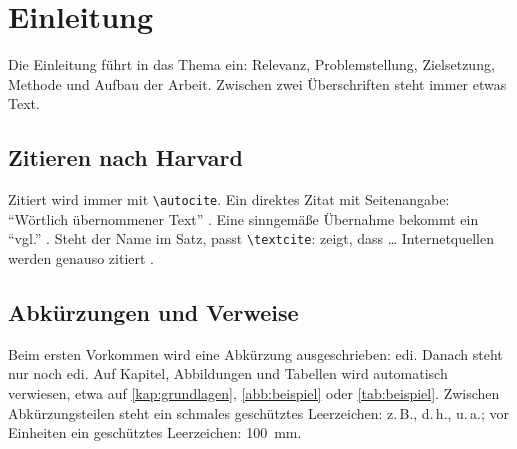 \chapter{Einleitung}
\label{kap:einleitung}

Die Einleitung führt in das Thema ein: Relevanz, Problemstellung, Zielsetzung,
Methode und Aufbau der Arbeit. Zwischen zwei Überschriften steht immer etwas Text.

\section{Zitieren nach Harvard}

Zitiert wird immer mit \verb|\autocite|. Ein direktes Zitat mit Seitenangabe:
\enquote{Wörtlich übernommener Text} \autocite[12]{mustermann2023}. Eine
sinngemäße Übernahme bekommt ein \enquote{vgl.} \autocite[vgl.][45--47]{schmidt2021}.
Steht der Name im Satz, passt \verb|\textcite|: \textcite{weber2024} zeigt, dass
\dots{} Internetquellen werden genauso zitiert \autocite{beispielblog2025}.

\section{Abkürzungen und Verweise}

Beim ersten Vorkommen wird eine Abkürzung ausgeschrieben: \ac{edi}. Danach steht nur
noch \ac{edi}. Auf Kapitel, Abbildungen und Tabellen wird automatisch verwiesen,
etwa auf \autoref{kap:grundlagen}, \autoref{abb:beispiel} oder \autoref{tab:beispiel}.
Zwischen Abkürzungsteilen steht ein schmales geschütztes Leerzeichen: z.\,B., d.\,h.,
u.\,a.; vor Einheiten ein geschütztes Leerzeichen: 100~mm.
